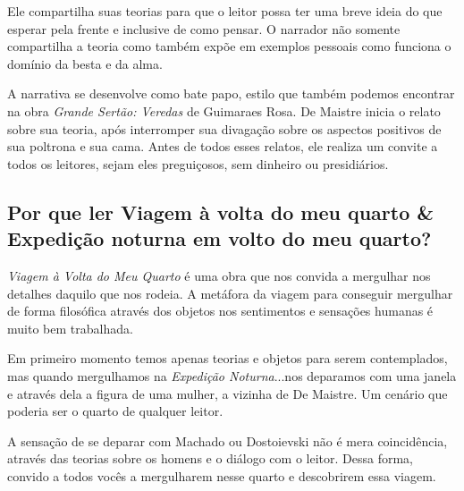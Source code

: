 \documentclass[12pt]{extarticle}
\begin{document}


Ele compartilha suas teorias para que o leitor possa ter uma breve ideia
do que esperar pela frente e inclusive de como pensar. O narrador não
somente compartilha a teoria como também expõe em exemplos pessoais como
funciona o domínio da besta e da alma.

A narrativa se desenvolve como bate papo, estilo que também podemos
encontrar na obra \textit{Grande Sertão: Veredas} de Guimaraes Rosa. De
Maistre inicia o relato sobre sua teoria, após interromper sua divagação
sobre os aspectos positivos de sua poltrona e sua cama. Antes de todos
esses relatos, ele realiza um convite a todos os leitores, sejam eles
preguiçosos, sem dinheiro ou presidiários.




\subsection{Por que ler Viagem à volta do meu quarto \& Expedição noturna em
volto do meu quarto?}

\emph{Viagem à Volta do Meu Quarto} é uma obra que nos convida a
mergulhar nos detalhes daquilo que nos rodeia. A metáfora da viagem para
conseguir mergulhar de forma filosófica através dos objetos nos
sentimentos e sensações humanas é muito bem trabalhada.

Em primeiro momento temos apenas teorias e objetos para serem
contemplados, mas quando mergulhamos na \emph{Expedição Noturna}...nos
deparamos com uma janela e através dela a figura de uma mulher, a
vizinha de De Maistre. Um cenário que poderia ser o quarto de qualquer
leitor.

A sensação de se deparar com Machado ou Dostoievski não é mera
coincidência, através das teorias sobre os homens e o diálogo com o
leitor. Dessa forma, convido a todos vocês a mergulharem nesse quarto e
descobrirem essa viagem.


\end{document}
